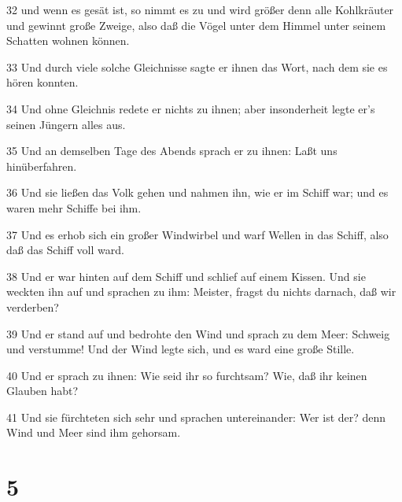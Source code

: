 \par 32 und wenn es gesät ist, so nimmt es zu und wird größer denn alle Kohlkräuter und gewinnt große Zweige, also daß die Vögel unter dem Himmel unter seinem Schatten wohnen können.
\par 33 Und durch viele solche Gleichnisse sagte er ihnen das Wort, nach dem sie es hören konnten.
\par 34 Und ohne Gleichnis redete er nichts zu ihnen; aber insonderheit legte er's seinen Jüngern alles aus.
\par 35 Und an demselben Tage des Abends sprach er zu ihnen: Laßt uns hinüberfahren.
\par 36 Und sie ließen das Volk gehen und nahmen ihn, wie er im Schiff war; und es waren mehr Schiffe bei ihm.
\par 37 Und es erhob sich ein großer Windwirbel und warf Wellen in das Schiff, also daß das Schiff voll ward.
\par 38 Und er war hinten auf dem Schiff und schlief auf einem Kissen. Und sie weckten ihn auf und sprachen zu ihm: Meister, fragst du nichts darnach, daß wir verderben?
\par 39 Und er stand auf und bedrohte den Wind und sprach zu dem Meer: Schweig und verstumme! Und der Wind legte sich, und es ward eine große Stille.
\par 40 Und er sprach zu ihnen: Wie seid ihr so furchtsam? Wie, daß ihr keinen Glauben habt?
\par 41 Und sie fürchteten sich sehr und sprachen untereinander: Wer ist der? denn Wind und Meer sind ihm gehorsam.

\chapter{5}

